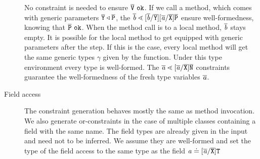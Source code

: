 \begin{description}
No constraint is needed to ensure $\ol{V}\ \texttt{ok}$.
If we call a method, which comes with generic parameters $\overline{\tt Y} \triangleleft \overline{\tt P}$,
the $\overline{\tt \mathit{ b }} \lessdot [\overline{\tt \mathit{ b }}/\overline{\tt Y}][\overline{\tt \mathit{ a }}/\overline{\tt X}]\overline{\tt P}$ ensure well-formedness, knowing that $\ol{P}\ \texttt{ok}$.
When the method call is to a local method, $\overline{\tt \mathit{ b }}$ stays empty.
It is possible for the local method to get equipped with generic parameters after the \unify{} step.
If this is the case, every local method will get the same generic types $\gamma$ given by the \unify{} function.
Under this type environment every type is well-formed.
The $\overline{\tt \mathit{ a }} \lessdot [\overline{\mathit{ a }}/\overline{\tt X}]\overline{\tt N}$ constraints guarantee the well-formedness of the fresh type variables $\overline{\tt \mathit{ a }}$.

\item[Field access]
The constraint generation behaves mostly the same as method invocation.
We also generate or-constraints in the case of multiple classes containing a field with the same name.
The field types are already given in the input and need not to be inferred.
We assume they are well-formed and set the type of the field access to the same type as the field $\mathit{ a } \doteq
[\overline{\mathit{ a }}/\overline{\tt X}]\texttt{T}$


\end{description}
